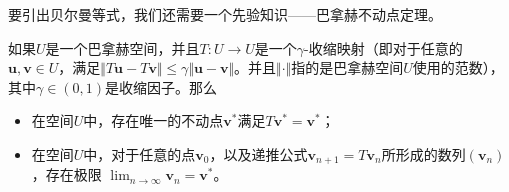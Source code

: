 要引出贝尔曼等式，我们还需要一个先验知识——巴拿赫不动点定理。
\begin{theorem}
    如果$U$是一个巴拿赫空间，并且$T:U\rightarrow U$是一个$\gamma$-收缩映射（即对于任意的$\mathbf{u},\mathbf{v}\in U$，满足$\Vert T\mathbf{u} - T\mathbf{v}\Vert \le \gamma \Vert \mathbf{u} - \mathbf{v} \Vert$。并且$\Vert\cdot\Vert$指的是巴拿赫空间$U$使用的范数），其中$\gamma\in(0,1)$是收缩因子。那么
    \begin{itemize}
        \item 在空间$U$中，存在唯一的不动点$\mathbf{v}^*$满足$T\mathbf{v}^* = \mathbf{v}^*$；
        \item 在空间$U$中，对于任意的点$\mathbf{v}_0$，以及递推公式$\mathbf{v}_{n+1} = T\mathbf{v}_n$所形成的数列$(\mathbf{v}_n)$，存在极限 $\lim_{n\rightarrow\infty}\mathbf{v}_n = \mathbf{v}^*$。
    \end{itemize}
\end{theorem}
